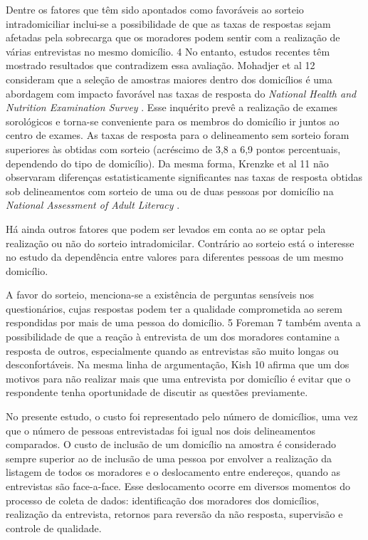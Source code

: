 \documentclass{article}
\begin{document}
Dentre os fatores que têm sido apontados como favoráveis ao sorteio intradomiciliar inclui-se a possibilidade de que as taxas de respostas sejam afetadas pela sobrecarga que os moradores podem sentir com a realização de várias entrevistas no mesmo domicílio.%
4%
 No entanto, estudos recentes têm mostrado resultados que contradizem essa avaliação. Mohadjer et al%
12%
 consideram que a seleção de amostras maiores dentro dos domicílios é uma abordagem com impacto favorável nas taxas de resposta do %
\textit{National Health and Nutrition Examination Survey}
. Esse inquérito prevê a realização de exames sorológicos e torna-se conveniente para os membros do domicílio ir juntos ao centro de exames. As taxas de resposta para o delineamento sem sorteio foram superiores às obtidas com sorteio (acréscimo de 3,8 a 6,9 pontos percentuais, dependendo do tipo de domicílio). Da mesma forma, Krenzke et al%
11%
 não observaram diferenças estatisticamente significantes nas taxas de resposta obtidas sob delineamentos com sorteio de uma ou de duas pessoas por domicílio na %
\textit{National Assessment of Adult Literacy}
.

Há ainda outros fatores que podem ser levados em conta ao se optar pela realização ou não do sorteio intradomicilar. Contrário ao sorteio está o interesse no estudo da dependência entre valores para diferentes pessoas de um mesmo domicílio.

A favor do sorteio, menciona-se a existência de perguntas sensíveis nos questionários, cujas respostas podem ter a qualidade comprometida ao serem respondidas por mais de uma pessoa do domicílio.%
5%
 Foreman%
7%
 também aventa a possibilidade de que a reação à entrevista de um dos moradores contamine a resposta de outros, especialmente quando as entrevistas são muito longas ou desconfortáveis. Na mesma linha de argumentação, Kish%
10%
 afirma que um dos motivos para não realizar mais que uma entrevista por domicílio é evitar que o respondente tenha oportunidade de discutir as questões previamente.

No presente estudo, o custo foi representado pelo número de domicílios, uma vez que o número de pessoas entrevistadas foi igual nos dois delineamentos comparados. O custo de inclusão de um domicílio na amostra é considerado sempre superior ao de inclusão de uma pessoa por envolver a realização da listagem de todos os moradores e o deslocamento entre endereços, quando as entrevistas são face-a-face. Esse deslocamento ocorre em diversos momentos do processo de coleta de dados: identificação dos moradores dos domicílios, realização da entrevista, retornos para reversão da não resposta, supervisão e controle de qualidade.
\end{document}
